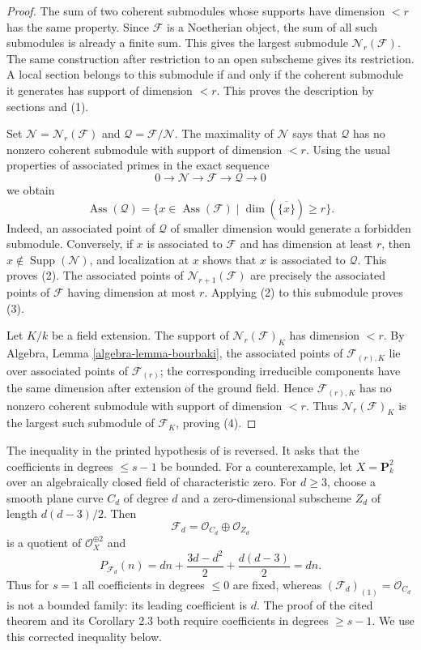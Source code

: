 \begin{proof}
The sum of two coherent submodules whose supports have dimension $<r$ has
the same property. Since $\mathcal{F}$ is a Noetherian object, the sum of all
such submodules is already a finite sum. This gives the largest submodule
$\mathcal{N}_r(\mathcal{F})$. The same construction after restriction to an
open subscheme gives its restriction. A local section belongs to this
submodule if and only if the coherent submodule it generates has support of
dimension $<r$. This proves the description by sections and (1).

Set $\mathcal{N}=\mathcal{N}_r(\mathcal{F})$ and
$\mathcal{Q}=\mathcal{F}/\mathcal{N}$. The maximality of $\mathcal{N}$ says
that $\mathcal{Q}$ has no nonzero coherent submodule with support of
dimension $<r$. Using the usual properties of associated primes in the exact
sequence
$$
0\longrightarrow\mathcal{N}\longrightarrow\mathcal{F}
\longrightarrow\mathcal{Q}\longrightarrow0
$$
we obtain
$$
\operatorname{Ass}(\mathcal{Q})=
\{x\in\operatorname{Ass}(\mathcal{F})\mid
\dim(\overline{\{x\}})\geq r\}.
$$
Indeed, an associated point of $\mathcal{Q}$ of smaller dimension would
generate a forbidden submodule. Conversely, if $x$ is associated to
$\mathcal{F}$ and has dimension at least $r$, then
$x\notin\operatorname{Supp}(\mathcal{N})$, and localization at $x$ shows that
$x$ is associated to $\mathcal{Q}$. This proves (2). The associated points of
$\mathcal{N}_{r+1}(\mathcal{F})$ are precisely the associated points of
$\mathcal{F}$ having dimension at most $r$. Applying (2) to this submodule
proves (3).

Let $K/k$ be a field extension. The support of
$\mathcal{N}_r(\mathcal{F})_K$ has dimension $<r$. By Algebra, Lemma
\ref{algebra-lemma-bourbaki}, the associated points of
$\mathcal{F}_{(r),K}$ lie over associated points of
$\mathcal{F}_{(r)}$; the corresponding irreducible components have the same
dimension after extension of the ground field. Hence
$\mathcal{F}_{(r),K}$ has no nonzero coherent submodule with support of
dimension $<r$. Thus $\mathcal{N}_r(\mathcal{F})_K$ is the largest such
submodule of $\mathcal{F}_K$, proving (4).
\end{proof}

\begin{remark}
\label{remark-FGA-Hilbert-coefficient-inequality}
The inequality in the printed hypothesis of
\cite[Expos\'e 221, Theorem 2.2, pp. 254--255]{FGA} is reversed. It asks that
the coefficients in degrees $\leq s-1$ be bounded. For a counterexample, let
$X=\mathbf{P}^2_k$ over an algebraically closed field of characteristic zero.
For $d\geq3$, choose a smooth plane curve $C_d$ of degree $d$ and a
zero-dimensional subscheme $Z_d$ of length $d(d-3)/2$. Then
$$
\mathcal{F}_d=\mathcal{O}_{C_d}\oplus\mathcal{O}_{Z_d}
$$
is a quotient of $\mathcal{O}_X^{\oplus2}$ and
$$
P_{\mathcal{F}_d}(n)=
dn+\frac{3d-d^2}{2}+\frac{d(d-3)}2=dn.
$$
Thus for $s=1$ all coefficients in degrees $\leq0$ are fixed, whereas
$(\mathcal{F}_d)_{(1)}=\mathcal{O}_{C_d}$ is not a bounded family: its leading
coefficient is $d$. The proof of the cited theorem and its Corollary 2.3 both
require coefficients in degrees $\geq s-1$. We use this corrected inequality
below.
\end{remark}


